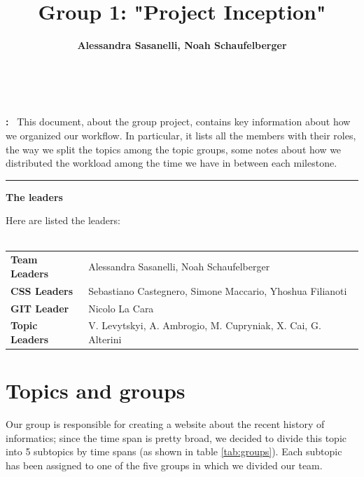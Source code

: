 \documentclass{article}
\title{Group 1: "Project Inception"}
\author{\textbf{\normalsize Alessandra Sasanelli, \normalsize Noah Schaufelberger}}
\makeatletter
\renewcommand{\maketitle}{
    \bgroup\setlength{\parindent}{0pt}
    \begin{flushleft}
        \hspace{-5cm}\textbf{\LARGE \@title} \\ %
        \vspace{.4cm}
        \hspace{-5cm}\@author %
    \end{flushleft}\egroup
}
\renewenvironment{abstract}
    {\par\noindent\textbf{\abstractname:}\ \ignorespaces}
    {\par\medskip}
\makeatother
\begin{document}
	
    \maketitle %
    
    \bigskip
    \bigskip
    
    \begin{abstract}
        This document, about the group project, contains key information about how we organized our workflow. 
        In particular, it lists all the members with their roles, the way we split the topics among the topic groups, 
        some notes about how we distributed the workload among the time we have in between each milestone.
    \end{abstract}
    
    \noindent\rule{\textwidth}{.5pt} 
    
    \bigskip
    
    \vspace{.2cm}
    \noindent \textbf{\large The leaders} %
    
    \bigskip
    
    \noindent Here are listed the leaders:\\ \\
    \noindent \begin{tabular}{@{}ll}
        \textbf{Team Leaders} & Alessandra Sasanelli, Noah Schaufelberger\\
        \textbf{CSS Leaders} & Sebastiano Castegnero, Simone Maccario, Yhoshua Filianoti\\
        \textbf{GIT Leader} & Nicolo La Cara\\
        \textbf{Topic Leaders} & V. Levytskyi, A. Ambrogio, M. Cupryniak, X. Cai, G. Alterini\\
    \end{tabular}
    \bigskip
    
    \section{Topics and groups}
    Our group is responsible for creating a website about the recent history of informatics; 
    since the time span is pretty broad, we decided to divide this topic into 5 subtopics by time spans (as shown in table \ref{tab:groups}).
    Each subtopic has been assigned to one of the five groups in which we divided our team.
    
\end{document}
